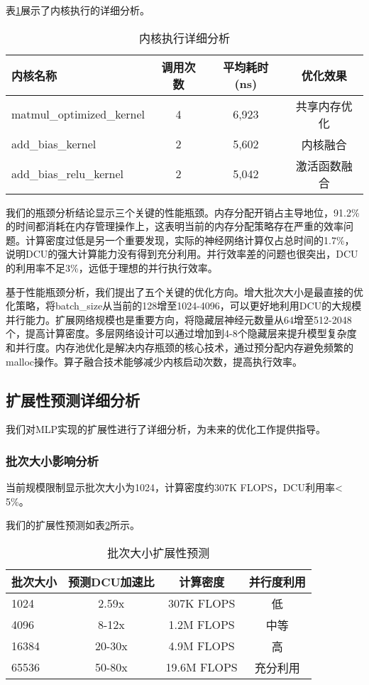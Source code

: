 \documentclass[12pt,a4paper]{article}
\begin{document}
表\ref{tab:mlp_kernel_analysis}展示了内核执行的详细分析。

\begin{table}[H]
\centering
\caption{内核执行详细分析}
\label{tab:mlp_kernel_analysis}
\begin{tabular}{lccc}
\toprule
内核名称 & 调用次数 & 平均耗时(ns) & 优化效果 \\
\midrule
matmul\_optimized\_kernel & 4 & 6,923 & 共享内存优化 \\
add\_bias\_kernel & 2 & 5,602 & 内核融合 \\
add\_bias\_relu\_kernel & 2 & 5,042 & 激活函数融合 \\
\bottomrule
\end{tabular}
\end{table}

我们的瓶颈分析结论显示三个关键的性能瓶颈。内存分配开销占主导地位，91.2\%的时间都消耗在内存管理操作上，这表明当前的内存分配策略存在严重的效率问题。计算密度过低是另一个重要发现，实际的神经网络计算仅占总时间的1.7\%，说明DCU的强大计算能力没有得到充分利用。并行效率差的问题也很突出，DCU的利用率不足3\%，远低于理想的并行执行效率。

基于性能瓶颈分析，我们提出了五个关键的优化方向。增大批次大小是最直接的优化策略，将batch\_size从当前的128增至1024-4096，可以更好地利用DCU的大规模并行能力。扩展网络规模也是重要方向，将隐藏层神经元数量从64增至512-2048个，提高计算密度。多层网络设计可以通过增加到4-8个隐藏层来提升模型复杂度和并行度。内存池优化是解决内存瓶颈的核心技术，通过预分配内存避免频繁的malloc操作。算子融合技术能够减少内核启动次数，提高执行效率。

\subsection{扩展性预测详细分析}

我们对MLP实现的扩展性进行了详细分析，为未来的优化工作提供指导。

\subsubsection{批次大小影响分析}

当前规模限制显示批次大小为1024，计算密度约307K FLOPS，DCU利用率< 5\%。

我们的扩展性预测如表\ref{tab:batch_size_prediction}所示。

\begin{table}[H]
\centering
\caption{批次大小扩展性预测}
\label{tab:batch_size_prediction}
\begin{tabular}{lccc}
\toprule
批次大小 & 预测DCU加速比 & 计算密度 & 并行度利用 \\
\midrule
1024 & 2.59x & 307K FLOPS & 低 \\
4096 & 8-12x & 1.2M FLOPS & 中等 \\
16384 & 20-30x & 4.9M FLOPS & 高 \\
65536 & 50-80x & 19.6M FLOPS & 充分利用 \\
\bottomrule
\end{tabular}
\end{table}
\end{document}
